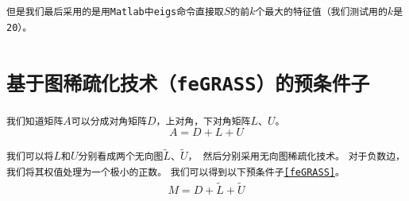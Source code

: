 \documentclass[11pt, a4paper]{article}
\theoremstyle{plain}
\theoremstyle{plain}
\theoremstyle{plain}
\theoremstyle{definition}
\theoremstyle{remark}
\theoremstyle{definition}
\newcommand{\T}[1]{\texttt{#1}}
\begin{document}
\T{但是我们最后采用的是用Matlab中eigs命令直接取$S$的前$k$个最大的特征值（我们测试用的$k$是20）。}


\section{\T{基于图稀疏化技术（feGRASS）的预条件子}}

\T{我们知道矩阵$A$可以分成对角矩阵$D$，上对角，下对角矩阵$L$、$U$。}
\begin{equation}
	A = D + L + U
\end{equation}

\T{我们可以将$L$和$U$分别看成两个无向图$\tilde{L}$、$\tilde{U}$， 然后分别采用无向图稀疏化技术\cite{Sparse}。}
\T{对于负数边，我们将其权值处理为一个极小的正数。}
\T{我们可以得到以下预条件子\ref{feGRASS}。}
\begin{align}
		\label{feGRASS}
		\tag{图稀疏化预条件子}
		M = D + \tilde{L} + \tilde{U}
\end{align}
\end{document}
